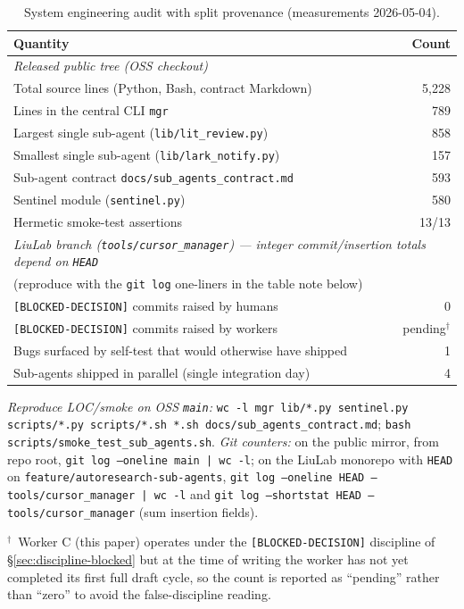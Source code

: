 \begin{table}[t]
  \caption{System engineering audit with split provenance (measurements 2026-05-04).}
  \label{tab:engineering}
  \centering
  \small
  \begin{tabular}{l r}
    \toprule
    \textbf{Quantity} & \textbf{Count} \\
    \midrule
    \multicolumn{2}{l}{\emph{Released public tree (OSS checkout)}} \\
    Total source lines (Python, Bash, contract Markdown)               & 5,228 \\
    Lines in the central CLI \texttt{mgr}                             &   789 \\
    Largest single sub-agent (\texttt{lib/lit\_review.py})           &   858 \\
    Smallest single sub-agent (\texttt{lib/lark\_notify.py})           &   157 \\
    Sub-agent contract \texttt{docs/sub\_agents\_contract.md}         &   593 \\
    Sentinel module (\texttt{sentinel.py})                            &   580 \\
    Hermetic smoke-test assertions                                     & 13/13 \\
    \midrule
    \multicolumn{2}{l}{\emph{LiuLab branch (\texttt{tools/cursor\_manager}) --- integer commit/insertion totals depend on \texttt{HEAD}}} \\
    \multicolumn{2}{l}{\footnotesize (reproduce with the \texttt{git log} one-liners in the table note below)} \\
    \texttt{[BLOCKED-DECISION]} commits raised by humans              &     0 \\
    \texttt{[BLOCKED-DECISION]} commits raised by workers             & pending\(^\dagger\) \\
    Bugs surfaced by self-test that would otherwise have shipped    &     1 \\
    Sub-agents shipped in parallel (single integration day)           &     4 \\
    \bottomrule
  \end{tabular}

  \medskip
  \footnotesize
  \noindent\emph{Reproduce LOC/smoke on OSS \texttt{main}:} \texttt{wc -l mgr lib/*.py sentinel.py scripts/*.py scripts/*.sh *.sh docs/sub\_agents\_contract.md}; \texttt{bash scripts/smoke\_test\_sub\_agents.sh}. \emph{Git counters:} on the public mirror, from repo root, \texttt{git log --oneline main | wc -l}; on the LiuLab monorepo with \texttt{HEAD} on \texttt{feature/autoresearch-sub-agents}, \texttt{git log --oneline HEAD -- tools/cursor\_manager | wc -l} and \texttt{git log --shortstat HEAD -- tools/cursor\_manager} (sum insertion fields).

  \medskip
  \(^\dagger\)~Worker C (this paper) operates under the
  \texttt{[BLOCKED-DECISION]} discipline of \S\ref{sec:discipline-blocked}
  but at the time of writing the worker has not yet completed its first
  full draft cycle, so the count is reported as ``pending'' rather than
  ``zero'' to avoid the false-discipline reading.
\end{table}

